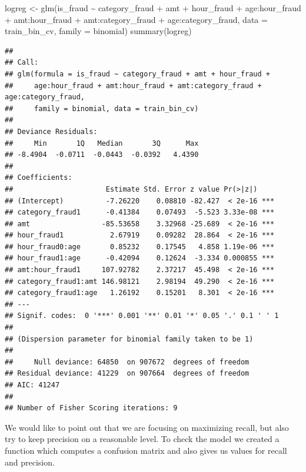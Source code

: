 \documentclass[
]{report}
\newenvironment{Shaded}{\begin{snugshade}}{\end{snugshade}}
\newcommand{\AttributeTok}[1]{\textcolor[rgb]{0.77,0.63,0.00}{#1}}
\newcommand{\FunctionTok}[1]{\textcolor[rgb]{0.00,0.00,0.00}{#1}}
\newcommand{\NormalTok}[1]{#1}
\newcommand{\OtherTok}[1]{\textcolor[rgb]{0.56,0.35,0.01}{#1}}
\newcommand{\SpecialCharTok}[1]{\textcolor[rgb]{0.00,0.00,0.00}{#1}}
\begin{document}
\begin{Shaded}
\begin{Highlighting}[]
\NormalTok{logreg }\OtherTok{\textless{}{-}} \FunctionTok{glm}\NormalTok{(is\_fraud }\SpecialCharTok{\textasciitilde{}} 
\NormalTok{                category\_fraud }\SpecialCharTok{+}\NormalTok{ amt }\SpecialCharTok{+}\NormalTok{ hour\_fraud }\SpecialCharTok{+}\NormalTok{ age}\SpecialCharTok{:}\NormalTok{hour\_fraud }\SpecialCharTok{+}\NormalTok{ amt}\SpecialCharTok{:}\NormalTok{hour\_fraud }\SpecialCharTok{+} 
\NormalTok{                amt}\SpecialCharTok{:}\NormalTok{category\_fraud }\SpecialCharTok{+}\NormalTok{ age}\SpecialCharTok{:}\NormalTok{category\_fraud,}
              \AttributeTok{data =}\NormalTok{ train\_bin\_cv, }\AttributeTok{family =}\NormalTok{ binomial)}
\FunctionTok{summary}\NormalTok{(logreg)}
\end{Highlighting}
\end{Shaded}

\begin{verbatim}
## 
## Call:
## glm(formula = is_fraud ~ category_fraud + amt + hour_fraud + 
##     age:hour_fraud + amt:hour_fraud + amt:category_fraud + age:category_fraud, 
##     family = binomial, data = train_bin_cv)
## 
## Deviance Residuals: 
##     Min       1Q   Median       3Q      Max  
## -8.4904  -0.0711  -0.0443  -0.0392   4.4390  
## 
## Coefficients:
##                      Estimate Std. Error z value Pr(>|z|)    
## (Intercept)          -7.26220    0.08810 -82.427  < 2e-16 ***
## category_fraud1      -0.41384    0.07493  -5.523 3.33e-08 ***
## amt                 -85.53658    3.32968 -25.689  < 2e-16 ***
## hour_fraud1           2.67919    0.09282  28.864  < 2e-16 ***
## hour_fraud0:age       0.85232    0.17545   4.858 1.19e-06 ***
## hour_fraud1:age      -0.42094    0.12624  -3.334 0.000855 ***
## amt:hour_fraud1     107.92782    2.37217  45.498  < 2e-16 ***
## category_fraud1:amt 146.98121    2.98194  49.290  < 2e-16 ***
## category_fraud1:age   1.26192    0.15201   8.301  < 2e-16 ***
## ---
## Signif. codes:  0 '***' 0.001 '**' 0.01 '*' 0.05 '.' 0.1 ' ' 1
## 
## (Dispersion parameter for binomial family taken to be 1)
## 
##     Null deviance: 64850  on 907672  degrees of freedom
## Residual deviance: 41229  on 907664  degrees of freedom
## AIC: 41247
## 
## Number of Fisher Scoring iterations: 9
\end{verbatim}

We would like to point out that we are focusing on maximizing recall,
but also try to keep precision on a reasonable level. To check the model
we created a function which computes a confusion matrix and also gives
us values for recall and precision.
\end{document}
